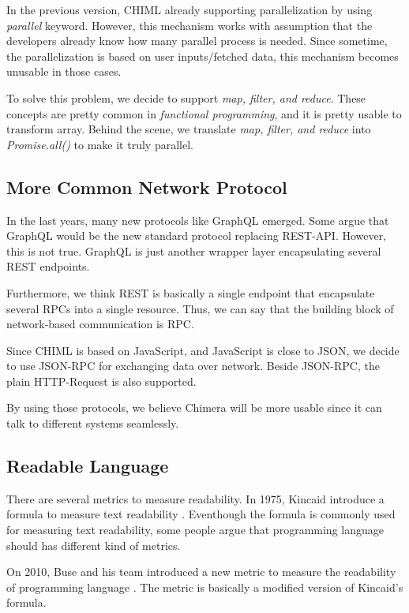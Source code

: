 \documentclass[conference]{IEEEtran}
\begin{document}
In the previous version, CHIML already supporting parallelization by using {\it parallel} keyword. However, this mechanism works with assumption that the developers already know how many parallel process is needed. Since sometime, the parallelization is based on user inputs/fetched data, this mechanism becomes unusable in those cases.

To solve this problem, we decide to support {\it map, filter, and reduce}. These concepts are pretty common in {\it functional programming}, and it is pretty usable to transform array. Behind the scene, we translate {\it map, filter, and reduce} into {\it Promise.all()} to make it truly parallel.

\subsection{More Common Network Protocol}

In the last years, many new protocols like GraphQL emerged. Some argue that GraphQL would be the new standard protocol replacing REST-API. However, this is not true. GraphQL is just another wrapper layer encapsulating several REST endpoints.

Furthermore, we think REST is basically a single endpoint that encapsulate several RPCs into a single resource. Thus, we can say that the building block of network-based communication is RPC.

Since CHIML is based on JavaScript, and JavaScript is close to JSON, we decide to use JSON-RPC for exchanging data over network. Beside JSON-RPC, the plain HTTP-Request is also supported.

By using those protocols, we believe Chimera will be more usable since it can talk to different systems seamlessly.

\subsection{Readable Language}

There are several metrics to measure readability. In 1975, Kincaid introduce a formula to measure text readability \cite{kincaid1975}. Eventhough the formula is commonly used for measuring text readability, some people argue that programming language should has different kind of metrics.

On 2010, Buse and his team introduced a new metric to measure the readability of programming language \cite{buse2010}. The metric is basically a modified version of Kincaid's formula.
\end{document}
